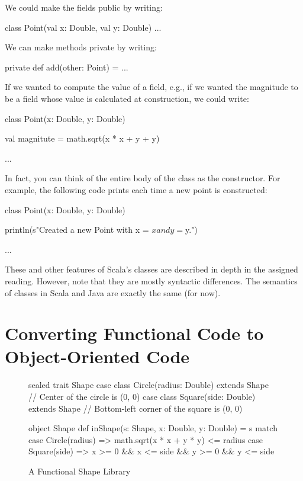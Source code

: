 \documentclass[9pt]{extbook}
\begin{document}
We could make the fields public by writing:
\begin{scalacode}
class Point(val x: Double, val y: Double) { ... }
\end{scalacode}

We can make methods private by writing:
\begin{scalacode}
private def add(other: Point) = { ... }
\end{scalacode}

If we wanted to compute the value of a field, e.g., if we wanted the magnitude
to be a field whose value is calculated at construction, we could write:
%
\begin{scalacode}
class Point(x: Double, y: Double) {

  val magnitute = math.sqrt(x * x + y + y)

  ...
}
\end{scalacode}

In fact, you can think of the entire body of the class as the constructor.
For example, the following code prints each time a new point is constructed:

%
\begin{scalacode}
class Point(x: Double, y: Double) {

  println(s"Created a new Point with x = $x and y = $y.")

  ...
}
\end{scalacode}

These and other features of Scala's classes are described in depth in the
assigned reading. However, note that they are mostly syntactic differences.
The semantics of classes in Scala and Java are exactly the same (for now).

\section{Converting Functional Code to Object-Oriented Code}

\begin{figure}
\begin{scalacode}
sealed trait Shape
case class Circle(radius: Double) extends Shape // Center of the circle is (0, 0)
case class Square(side: Double) extends Shape // Bottom-left corner of the square is (0, 0)

object Shape {
  def inShape(s: Shape, x: Double, y: Double) = s match {
    case Circle(radius) => math.sqrt(x * x + y * y) <= radius
    case Square(side) => x >= 0 && x <= side && y >= 0 && y <= side
  }
}
\end{scalacode}
\caption{A Functional Shape Library}
\label{fshapes1}
\end{figure}
\end{document}

